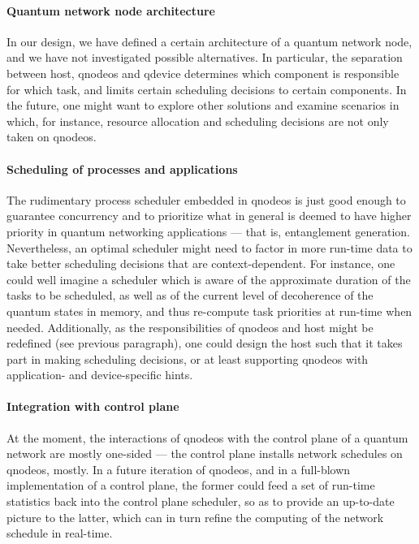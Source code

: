 \paragraph{Quantum network node architecture}

In our design, we have defined a certain architecture of a quantum network node, and we have not
investigated possible alternatives. In particular, the separation between host, \acrshort{qnodeos}
and \acrshort{qdevice} determines which component is responsible for which task, and limits certain
scheduling decisions to certain components. In the future, one might want to explore other solutions
and examine scenarios in which, for instance, resource allocation and scheduling decisions are not
only taken on \acrshort{qnodeos}.

\paragraph{Scheduling of processes and applications}

The rudimentary process scheduler embedded in \acrshort{qnodeos} is just good enough to guarantee
concurrency and to prioritize what in general is deemed to have higher priority in quantum
networking applications --- that is, entanglement generation. Nevertheless, an optimal scheduler
might need to factor in more run-time data to take better scheduling decisions that are
context-dependent. For instance, one could well imagine a scheduler which is aware of the
approximate duration of the tasks to be scheduled, as well as of the current level of decoherence of
the quantum states in memory, and thus re-compute task priorities at run-time when needed.
Additionally, as the responsibilities of \acrshort{qnodeos} and host might be redefined (see
previous paragraph), one could design the host such that it takes part in making scheduling
decisions, or at least supporting \acrshort{qnodeos} with application- and device-specific hints.

\paragraph{Integration with control plane}

At the moment, the interactions of \acrshort{qnodeos} with the control plane of a quantum network
are mostly one-sided --- the control plane installs network schedules on \acrshort{qnodeos}, mostly.
In a future iteration of \acrshort{qnodeos}, and in a full-blown implementation of a control plane,
the former could feed a set of run-time statistics back into the control plane scheduler, so as to
provide an up-to-date picture to the latter, which can in turn refine the computing of the network
schedule in real-time.

